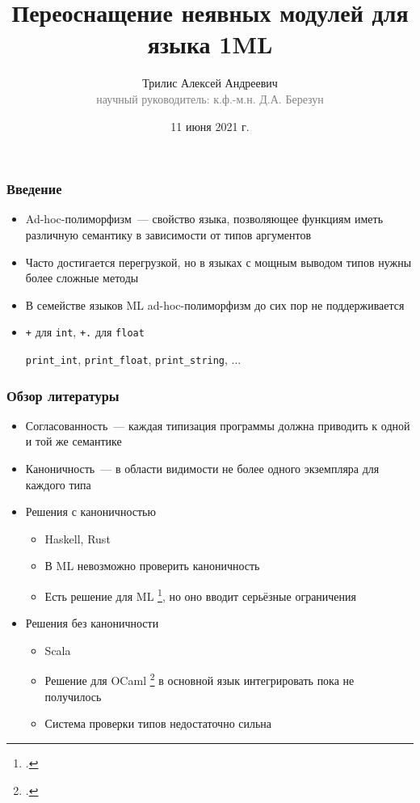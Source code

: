 \documentclass{beamer}
\begin{document}
\title[Неявные модули в 1ML]{Переоснащение неявных модулей для языка 1ML }
\author[Трилис А.А.]{Трилис Алексей Андреевич\\{\footnotesize\textcolor{gray}{научный руководитель: к.ф.-м.н. Д.А. Березун}}}
\date{11 июня 2021 г.}
\frame{\titlepage}

\begin{frame}\frametitle{Введение}
\begin{itemize}
  \item Ad-hoc-полиморфизм~--- свойство языка, позволяющее функциям иметь различную семантику в зависимости от типов аргументов
  \item Часто достигается перегрузкой, но в языках с мощным выводом типов нужны более сложные методы
  \item В семействе языков ML ad-hoc-полиморфизм до сих пор не поддерживается
  \item \texttt{+} для \texttt{int}, \texttt{+.} для \texttt{float}

  \texttt{print\_int}, \texttt{print\_float}, \texttt{print\_string}, ...
\end{itemize}
\end{frame}

\lstset{language=haskell}
\begin{frame}[fragile]\frametitle{Обзор литературы}
\begin{itemize}
  \item Согласованность~--- каждая типизация программы должна приводить к одной и той же семантике
  \item Каноничность~--- в области видимости не более одного экземпляра для каждого типа 
  \item Решения с каноничностью
  \begin{itemize}
    \item Haskell, Rust
    \item В ML невозможно проверить каноничность
    \item Есть решение для ML \footcite{ml_typeclasses}, но оно вводит серьёзные ограничения
  \end{itemize}
  \item Решения без каноничности
  \begin{itemize}
    \item Scala
    \item Решение для OCaml \footcite{white} в основной язык интегрировать пока не получилось
    \item Система проверки типов недостаточно сильна
  \end{itemize}
\end{itemize}
\end{frame}
\end{document}
